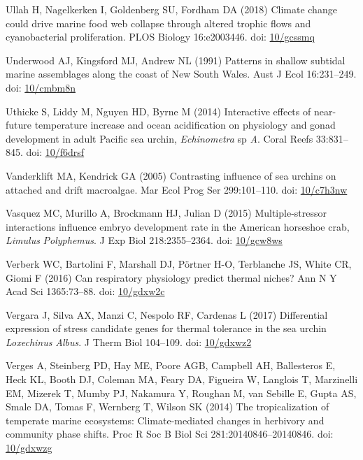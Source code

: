 \documentclass[a4paper,10pt, oneside]{memoir}
\begin{document}
\leavevmode\hypertarget{ref-Ullah2018}{}%
Ullah H, Nagelkerken I, Goldenberg SU, Fordham DA (2018) Climate change could drive marine food web collapse through altered trophic flows and cyanobacterial proliferation. PLOS Biology 16:e2003446. doi: \href{https://doi.org/10/gcssmq}{10/gcssmq}

\leavevmode\hypertarget{ref-Underwood1991}{}%
Underwood AJ, Kingsford MJ, Andrew NL (1991) Patterns in shallow subtidal marine assemblages along the coast of New South Wales. Aust J Ecol 16:231--249. doi: \href{https://doi.org/10/cmbm8n}{10/cmbm8n}

\leavevmode\hypertarget{ref-Uthicke2014}{}%
Uthicke S, Liddy M, Nguyen HD, Byrne M (2014) Interactive effects of near-future temperature increase and ocean acidification on physiology and gonad development in adult Pacific sea urchin, \emph{Echinometra} sp \emph{A}. Coral Reefs 33:831--845. doi: \href{https://doi.org/10/f6drsf}{10/f6drsf}

\leavevmode\hypertarget{ref-Vanderklift2005}{}%
Vanderklift MA, Kendrick GA (2005) Contrasting influence of sea urchins on attached and drift macroalgae. Mar Ecol Prog Ser 299:101--110. doi: \href{https://doi.org/10/c7h3nw}{10/c7h3nw}

\leavevmode\hypertarget{ref-Vasquez2015}{}%
Vasquez MC, Murillo A, Brockmann HJ, Julian D (2015) Multiple-stressor interactions influence embryo development rate in the American horseshoe crab, \emph{Limulus} \emph{Polyphemus}. J Exp Biol 218:2355--2364. doi: \href{https://doi.org/10/gcw8ws}{10/gcw8ws}

\leavevmode\hypertarget{ref-Verberk2016}{}%
Verberk WC, Bartolini F, Marshall DJ, Pörtner H-O, Terblanche JS, White CR, Giomi F (2016) Can respiratory physiology predict thermal niches? Ann N Y Acad Sci 1365:73--88. doi: \href{https://doi.org/10/gdxw2c}{10/gdxw2c}

\leavevmode\hypertarget{ref-Vergara2017}{}%
Vergara J, Silva AX, Manzi C, Nespolo RF, Cardenas L (2017) Differential expression of stress candidate genes for thermal tolerance in the sea urchin \emph{Loxechinus} \emph{Albus}. J Therm Biol 104--109. doi: \href{https://doi.org/10/gdxwz2}{10/gdxwz2}

\leavevmode\hypertarget{ref-Verges2014}{}%
Verges A, Steinberg PD, Hay ME, Poore AGB, Campbell AH, Ballesteros E, Heck KL, Booth DJ, Coleman MA, Feary DA, Figueira W, Langlois T, Marzinelli EM, Mizerek T, Mumby PJ, Nakamura Y, Roughan M, van Sebille E, Gupta AS, Smale DA, Tomas F, Wernberg T, Wilson SK (2014) The tropicalization of temperate marine ecosystems: Climate-mediated changes in herbivory and community phase shifts. Proc R Soc B Biol Sci 281:20140846--20140846. doi: \href{https://doi.org/10/gdxwzg}{10/gdxwzg}
\end{document}
